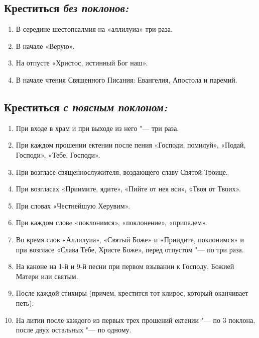 \mychapterending

 


\subsection*{Креститься \itshape без поклонов:}

\begin{enumerate}

\item В середине шестопсалмия на «аллилуиа» три раза. 

\item В начале «Верую». 

\item На отпусте «Христос, истинный Бог наш». 

\item В начале чтения Священного Писания: Евангелия, Апостола и паремий. 

\end{enumerate}

\subsection*{Креститься \itshape с поясным поклоном:}

\begin{enumerate}

\item При входе в храм и при выходе из него "--- три раза. 

\item При каждом прошении ектении после пения «Господи, помилуй», «Подай, Господи», «Тебе, Господи». 

\item При возгласе священнослужителя, воздающего славу Святой Троице. 

\item При возгласах «Приимите, ядите», «Пийте от нея вси», «Твоя от Твоих». 

\item При словах «Честнейшую Херувим». 

\item При каждом словe «поклонимся», «поклонение», «припадем». 

\item Во время слов «Аллилуиа», «Святый Боже» и «Приидите, поклонимся» и при возгласе «Слава Тебе, Христе Боже», перед отпустом "--- по три раза. 

\item На каноне на 1-й и 9-й песни при первом взывании к Господу, Божией Матери или святым.

\item После каждой стихиры (причем, крестится тот клирос, который оканчивает петь).

\item На литии после каждого из первых трех прошений ектении "--- по 3 поклона, после двух остальных "--- по одному.

\end{enumerate}

